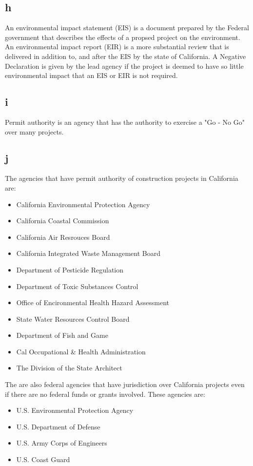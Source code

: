 \documentclass[12pt]{article} %
\begin{document}
	\subsection{h}
		An environmental impact statement (EIS) is a document prepared by the Federal government that describes the effects of a propsed project on the environment. An environmental impact report (EIR) is a more substantial review that is delivered in addition to, and after the EIS by the state of California. A Negative Declaration is given by the lead agency if the project is deemed to have so little environmental impact that an EIS or EIR is not required.
		
	\subsection{i}
		Permit authority is	an agency that has the authority to exercise a "Go - No Go" over many projects. 
	
	\subsection{j}
		The agencies that have permit authority of construction projects in California are:
		\begin{itemize}
			\item California Environmental Protection Agency
			\item California Coastal Commission
			\item California Air Resrouces Board
			\item California Integrated Waste Management Board
			\item Department of Pesticide Regulation
			\item Department of Toxic Substances Control
			\item Office of Encironmental Health Hazard Assessment
			\item State Water Resources Control Board
			\item Department of Fish and Game
			\item Cal Occupational \& Health Administration
			\item The Division of the State Architect
		\end{itemize}
	
		The are also federal agencies that have jurisdiction over California projects even if there are no federal funds or grants involved. These agencies are:
		\begin{itemize}
			\item U.S. Environmental Protection Agency
			\item U.S. Department of Defense
			\item U.S. Army Corps of Engineers
			\item U.S. Coast Guard
		\end{itemize}
		
\end{document}
